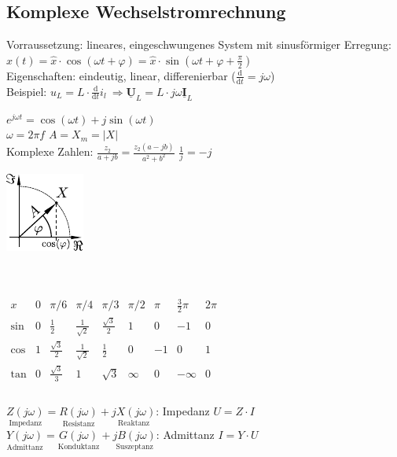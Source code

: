 \documentclass[6pt,a4paper]{scrartcl}
\renewcommand{\vec}[1]{\ensuremath{\underline{\boldsymbol {#1}}}}
\begin{document}
\begin{multicols}{4}
\section{Komplexe Wechselstromrechnung }
Vorraussetzung: lineares, eingeschwungenes System mit sinusförmiger Erregung: $x(t) = \hat x \cdot \cos(\omega t + \varphi) = \hat x \cdot \sin(\omega t + \varphi + \frac{\pi}{2})$\\
Eigenschaften: eindeutig, linear, differenierbar ($\frac{\mathrm d}{\mathrm dt} = j \omega$)\\
Beispiel: $u_L = L \cdot \frac{\mathrm d}{\mathrm dt} i_l \ \Rightarrow \vec U_L = L \cdot j \omega \vec I_L$\\[0.5em]
\parbox{5.1cm}{\Large $e^{j\omega t} = \cos(\omega t) + j \sin(\omega t)$ \\[0.2em] $\omega = 2 \pi f$ \qquad $A = X_m=|X|$ \\[0.2em] \normalsize Komplexe Zahlen: $\frac{z_2}{a+jb} = \frac{z_2(a-jb)}{a^2+b^2}$ \quad $ \frac{1}{j}=-j $ }
\parbox{1.7cm}{\includegraphics{./img/Zeiger.pdf}} \\
\\[0.5em]
$\begin{array}{c|c|c|c|c|c|c|c|c}
x & 0 & \pi / 6 & \pi / 4 & \pi / 3 & \pi / 2 & \pi & \frac{3}{2}\pi & 2 \pi \\ \hline
\sin & 0 & \frac{1}{2} & \frac{1}{\sqrt{2}} & \frac{\sqrt 3}{2} & 1 & 0 & -1 & 0 \\
\cos & 1 & \frac{\sqrt 3}{2} & \frac{1}{\sqrt 2} & \frac{1}{2} & 0 & -1 & 0 & 1 \\   
\tan & 0 & \frac{\sqrt{3}}{3}&	1				 &	\sqrt{3} & \infty & 0 & - \infty & 0\\  
\end{array}$\\
\\
$\underset{\text{Impedanz}}{Z(j\omega)} = \underset{\text{Resistanz}}{R(j\omega)} + \underset{\text{Reaktanz}}{jX(j\omega)}$: Impedanz $U = Z \cdot I $\\
$\underset{\text{Admittanz}}{Y(j\omega)} = \underset{\text{Konduktanz}}{G(j\omega)} + \underset{\text{Suszeptanz}}{jB(j\omega)}$: Admittanz $I = Y \cdot U$\\



\end{multicols}
\end{document}

